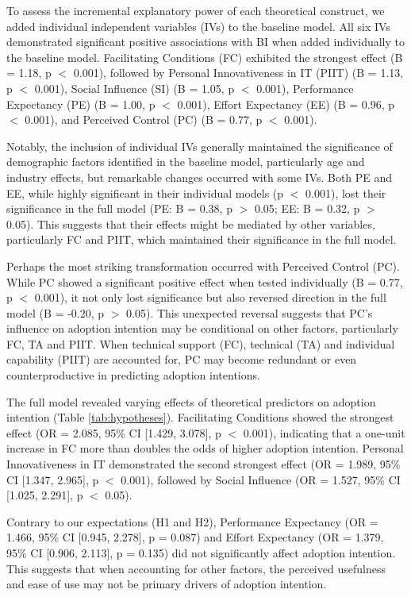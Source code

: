 \documentclass[twocolumn]{article}
\begin{document}
To assess the incremental explanatory power of each theoretical construct, we added individual independent variables (IVs) to the baseline model. All six IVs demonstrated significant positive associations with BI when added individually to the baseline model. Facilitating Conditions (FC) exhibited the strongest effect (B = 1.18, p $<$ 0.001), followed by Personal Innovativeness in IT (PIIT) (B = 1.13, p $<$ 0.001), Social Influence (SI) (B = 1.05, p $<$ 0.001), Performance Expectancy (PE) (B = 1.00, p $<$ 0.001), Effort Expectancy (EE) (B = 0.96, p $<$ 0.001), and Perceived Control (PC) (B = 0.77, p $<$ 0.001).

Notably, the inclusion of individual IVs generally maintained the significance of demographic factors identified in the baseline model, particularly age and industry effects, but remarkable changes occurred with some IVs. Both PE and EE, while highly significant in their individual models (p $<$ 0.001), lost their significance in the full model (PE: B = 0.38, p $>$ 0.05; EE: B = 0.32, p $>$ 0.05). This suggests that their effects might be mediated by other variables, particularly FC and PIIT, which maintained their significance in the full model.

Perhaps the most striking transformation occurred with Perceived Control (PC). While PC showed a significant positive effect when tested individually (B = 0.77, p $<$ 0.001), it not only lost significance but also reversed direction in the full model (B = -0.20, p $>$ 0.05). This unexpected reversal suggests that PC's influence on adoption intention may be conditional on other factors, particularly FC, TA and PIIT. When technical support (FC), technical (TA) and individual capability (PIIT) are accounted for, PC may become redundant or even counterproductive in predicting adoption intentions.

The full model revealed varying effects of theoretical predictors on adoption intention (Table \ref{tab:hypotheses}). Facilitating Conditions showed the strongest effect (OR = 2.085, 95\% CI [1.429, 3.078], p $<$ 0.001), indicating that a one-unit increase in FC more than doubles the odds of higher adoption intention. Personal Innovativeness in IT demonstrated the second strongest effect (OR = 1.989, 95\% CI [1.347, 2.965], p $<$ 0.001), followed by Social Influence (OR = 1.527, 95\% CI [1.025, 2.291], p $<$ 0.05).

Contrary to our expectations (H1 and H2), Performance Expectancy (OR = 1.466, 95\% CI [0.945, 2.278], p = 0.087) and Effort Expectancy (OR = 1.379, 95\% CI [0.906, 2.113], p = 0.135) did not significantly affect adoption intention. This suggests that when accounting for other factors, the perceived usefulness and ease of use may not be primary drivers of adoption intention.
\end{document}
